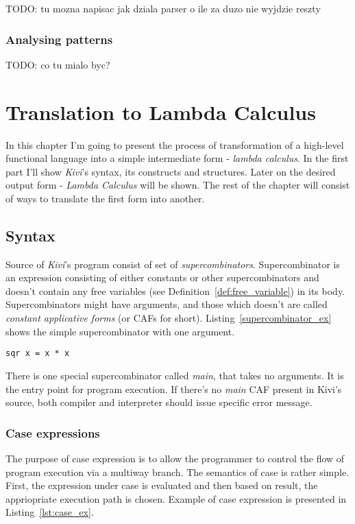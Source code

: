 \documentclass[a4paper]{report}
\begin{document}
TODO: tu mozna napisac jak dziala parser o ile za duzo nie wyjdzie reszty

\subsection{Analysing patterns}

TODO: co tu mialo byc?


\chapter{Translation to Lambda Calculus}

In this chapter I'm going to present the process of transformation of a
high-level functional language into a simple intermediate form - \textit{lambda
calculus}. In the first part I'll show \textit{Kivi}'s syntax, its
constructs and structures. Later on the desired output form -
\textit{Lambda Calculus} will be shown. The rest of the chapter will
consist of ways to translate the first form into another.

\section{Syntax}
Source of \textit{Kivi}'s program consist of set of
\textit{supercombinators}\cite{wiki:supercombinator}. Supercombinator is an
expression consisting of either constants or other supercombinators and doesn't
contain any free variables (see Definition~\ref{def:free_variable}) in its
body. Supercombinators might have arguments, and those which doesn't are called
\textit{constant applicative forms} (or CAFs for short).
Listing~\ref{supercombinator_ex} shows the simple supercombinator with one
argument.

\begin{lstlisting}[label=supercombinator_ex,caption={Simple supercombinator.}]
sqr x = x * x
\end{lstlisting}

There is one special supercombinator called \textit{main}, that takes no
arguments. It is the entry point for program execution. If there's no
\textit{main} CAF present in Kivi's source, both compiler and interpreter
should issue specific error message.

\subsection{Case expressions}
The purpose of case expression is to allow the programmer to control the flow
of program execution via a multiway branch. The semantics of case is rather
simple. First, the expression under case is evaluated and then based on result,
the appriopriate execution path is chosen. Example of case expression is
presented in Listing~\ref{lst:case_ex}.
\end{document}

